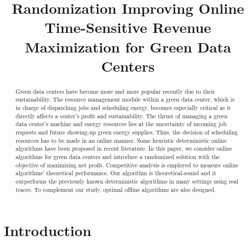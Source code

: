 \documentclass[conference]{IEEEtran}
\begin{document}
\title{Randomization Improving Online Time-Sensitive Revenue Maximization for Green Data Centers}

\author{
\and
{}
\and
{}
\and
{}
}
\maketitle



\begin{abstract}
Green data centers have become more and more popular recently due to their sustainability. The resource management module within a green data center, which is in charge of dispatching jobs and scheduling energy, becomes especially critical as it directly affects a center's profit and sustainability. The thrust of managing a green data center's machine and energy resources lies at the uncertainty of incoming job requests and future showing-up green energy supplies. Thus, the decision of scheduling resources has to be made in an online manner. Some heuristic deterministic online algorithms have been proposed in recent literature. In this paper, we consider online algorithms for green data centers and introduce a randomized solution with the objective of maximizing net profit. Competitive analysis is employed to measure online algorithms' theoretical performance. Our algorithm is theoretical-sound and it outperforms the previously known deterministic algorithms in many settings using real traces. To complement our study, optimal offline algorithms are also designed.
\end{abstract}



\section{Introduction}
\end{document}
